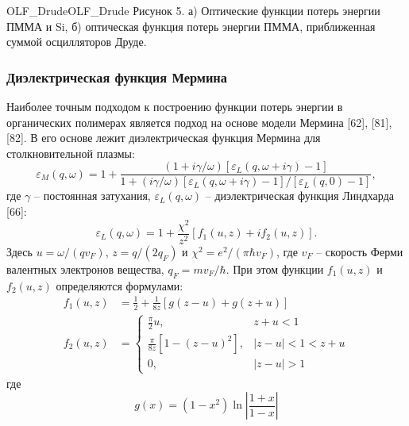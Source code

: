 \begin{fig}{OLF_Drude}{OLF_Drude}
	Рисунок 5. а) Оптические функции потерь энергии ПММА и Si, б) оптическая функция потерь энергии ПММА, приближенная суммой осцилляторов Друде.
\end{fig}


\subsubsection{Диэлектрическая функция Мермина}
Наиболее точным подходом к построению функции потерь энергии в органических полимерах является подход на основе модели Мермина [62], [81], [82]. В его основе лежит диэлектрическая функция Мермина для столкновительной плазмы:
\begin{equation}
	\varepsilon_M(q, \omega)=1+\frac{(1+i \gamma / \omega)\left[\varepsilon_L(q, \omega+i \gamma)-1\right]}{1+(i \gamma / \omega)\left[\varepsilon_L(q, \omega+i \gamma)-1\right] /\left[\varepsilon_L(q, 0)-1\right]},
\end{equation}
где $\gamma$ -- постоянная затухания, $\varepsilon_L(q, \omega)$ -- диэлектрическая функция Линдхарда [66]:
\begin{equation}
	\varepsilon_L(q, \omega)=1+\frac{\chi^2}{z^2}\left[f_1(u, z)+i f_2(u, z)\right].
\end{equation}
Здесь $u=\omega /\left(q v_F\right)$, $z=q /\left(2 q_F\right)$ и $\chi^2=e^2 /\left(\pi \hbar v_F\right)$, где $v_F$
-- скорость Ферми валентных электронов вещества, $q_F=m v_F / \hbar$. При этом функции $f_1(u, z)$ и $f_2(u, z)$ определяются формулами:
\begin{equation}
	\begin{aligned}
		f_1(u, z) &=\frac{1}{2}+\frac{1}{8 z}[g(z-u)+g(z+u)] \\
		f_2(u, z) &= \begin{cases}\frac{\pi}{2} u, & z+u<1 \\
			\frac{\pi}{8 z}\left[1-(z-u)^2\right], & |z-u|<1<z+u \\
			0, & |z-u|>1\end{cases}
	\end{aligned}
\end{equation}
где
\begin{equation}
	g(x)=\left(1-x^2\right) \ln \left|\frac{1+x}{1-x}\right|
\end{equation}


